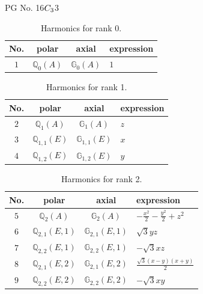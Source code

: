 \documentclass[fleqn,8pt,landscape]{jsarticle}
\begin{document}
\setcounter{MaxMatrixCols}{32}

\renewcommand{\tablename}{Table~}
\renewcommand{\figurename}{Figure~}
\begin{center}
\LARGE
PG No. 16\quad$C_{\rm 3}$\quad$3$\quad[ trigonal ]
\end{center}
\begin{table}[ht!]
\begin{center}
\caption{Harmonics for rank 0.}
\renewcommand{\arraystretch}{1.3}
\begin{tabular}{cccl} \hline \hline
No. & polar & axial & expression \\ \hline
$ 1 $ & $ \mathbb{Q}_{0}(A) $ & $ \mathbb{G}_{0}(A) $ & $ 1 $ \\
 \hline \hline
\end{tabular}
\end{center}
\end{table}
\begin{table}[ht!]
\begin{center}
\caption{Harmonics for rank 1.}
\renewcommand{\arraystretch}{1.3}
\begin{tabular}{cccl} \hline \hline
No. & polar & axial & expression \\ \hline
$ 2 $ & $ \mathbb{Q}_{1}(A) $ & $ \mathbb{G}_{1}(A) $ & $ z $ \\
$ 3 $ & $ \mathbb{Q}_{1,1}(E) $ & $ \mathbb{G}_{1,1}(E) $ & $ x $ \\
$ 4 $ & $ \mathbb{Q}_{1,2}(E) $ & $ \mathbb{G}_{1,2}(E) $ & $ y $ \\
 \hline \hline
\end{tabular}
\end{center}
\end{table}
\begin{table}[ht!]
\begin{center}
\caption{Harmonics for rank 2.}
\renewcommand{\arraystretch}{1.3}
\begin{tabular}{cccl} \hline \hline
No. & polar & axial & expression \\ \hline
$ 5 $ & $ \mathbb{Q}_{2}(A) $ & $ \mathbb{G}_{2}(A) $ & $ - \frac{x^{2}}{2} - \frac{y^{2}}{2} + z^{2} $ \\
$ 6 $ & $ \mathbb{Q}_{2,1}(E,1) $ & $ \mathbb{G}_{2,1}(E,1) $ & $ \sqrt{3} y z $ \\
$ 7 $ & $ \mathbb{Q}_{2,2}(E,1) $ & $ \mathbb{G}_{2,2}(E,1) $ & $ - \sqrt{3} x z $ \\
$ 8 $ & $ \mathbb{Q}_{2,1}(E,2) $ & $ \mathbb{G}_{2,1}(E,2) $ & $ \frac{\sqrt{3} \left(x - y\right) \left(x + y\right)}{2} $ \\
$ 9 $ & $ \mathbb{Q}_{2,2}(E,2) $ & $ \mathbb{G}_{2,2}(E,2) $ & $ - \sqrt{3} x y $ \\
 \hline \hline
\end{tabular}
\end{center}
\end{table}
\end{document}
